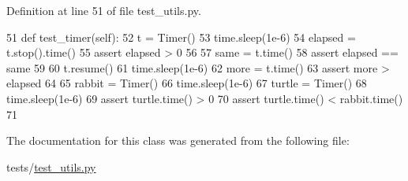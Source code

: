 Definition at line 51 of file test\+\_\+utils.\+py.


\begin{DoxyCode}
51     \textcolor{keyword}{def }test\_timer(self):
52         t = Timer()
53         time.sleep(1e-6)
54         elapsed = t.stop().time()
55         \textcolor{keyword}{assert} elapsed > 0
56 
57         same = t.time()
58         \textcolor{keyword}{assert} elapsed == same
59 
60         t.resume()
61         time.sleep(1e-6)
62         more = t.time()
63         \textcolor{keyword}{assert} more > elapsed
64 
65         rabbit = Timer()
66         time.sleep(1e-6)
67         turtle = Timer()
68         time.sleep(1e-6)
69         \textcolor{keyword}{assert} turtle.time() > 0
70         \textcolor{keyword}{assert} turtle.time() < rabbit.time()
71 
\end{DoxyCode}


The documentation for this class was generated from the following file\+:\begin{DoxyCompactItemize}
\item 
tests/\hyperlink{test__utils_8py}{test\+\_\+utils.\+py}\end{DoxyCompactItemize}
